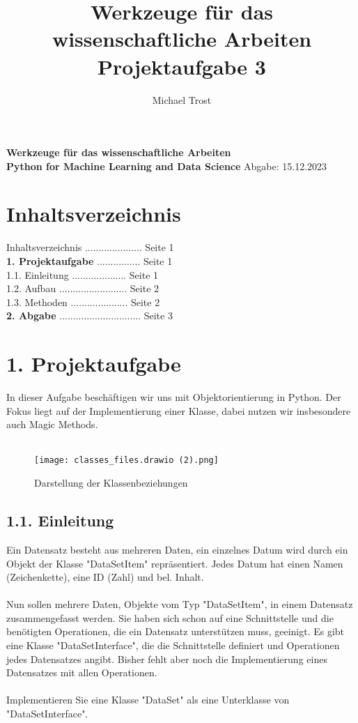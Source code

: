 \documentclass[
 oneside, %
 12pt, %
 a4paper, %
 parskip=full %
]{scrartcl}
\author{Michael Trost}
\title{Werkzeuge für das wissenschaftliche Arbeiten\\Projektaufgabe 3}
\begin{document}
\begin{center}
    \Large\textbf{Werkzeuge für das wissenschaftliche Arbeiten}\\
    \normalsize\noindent\textbf{Python for Machine Learning and Data Science} 
    \hspace{4.5cm}Abgabe: 15.12.2023
\end{center}

\section*{Inhaltsverzeichnis}
\hspace*{0.5cm} Inhaltsverzeichnis ..................... Seite 1 \\[0.2cm]
\hspace*{0.5cm} \textbf{1. Projektaufgabe} ................ Seite 1 \\
\hspace*{1cm}  1.1. Einleitung .................... Seite 1 \\
\hspace*{1cm}  1.2. Aufbau ......................... Seite 2 \\
\hspace*{1cm}  1.3. Methoden ..................... Seite 2 \\[0.2cm]
\hspace*{0.5cm} \textbf{2. Abgabe} .............................. Seite 3 \\

\section*{1. Projektaufgabe}
In dieser Aufgabe beschäftigen wir uns mit Objektorientierung in Python.
Der Fokus liegt auf der Implementierung einer Klasse, dabei nutzen wir insbesondere auch Magic Methods.\\
\\
\begin{figure}[htbp]
    \centering
    \texttt{[image: classes\_files.drawio (2).png]}
    \caption{Darstellung der Klassenbeziehungen}
\end{figure}

\subsection*{1.1. Einleitung}
Ein Datensatz besteht aus mehreren Daten, ein einzelnes Datum wird durch ein Objekt der Klasse "DataSetItem" repräsentiert.
Jedes Datum hat einen Namen (Zeichenkette), eine ID (Zahl) und bel. Inhalt.\\
\\
Nun sollen mehrere Daten, Objekte vom Typ "DataSetItem", in einem Datensatz zusammengefasst werden.
Sie haben sich schon auf eine Schnittstelle und die benötigten Operationen, die ein Datensatz unterstützen muss, geeinigt.
Es gibt eine Klasse "DataSetInterface", die die Schnittstelle definiert und Operationen jedes Datensatzes angibt.
Bisher fehlt aber noch die Implementierung eines Datensatzes mit allen Operationen.\\
\\
Implementieren Sie eine Klasse "DataSet" als eine Unterklasse von "DataSetInterface".
\end{document}
